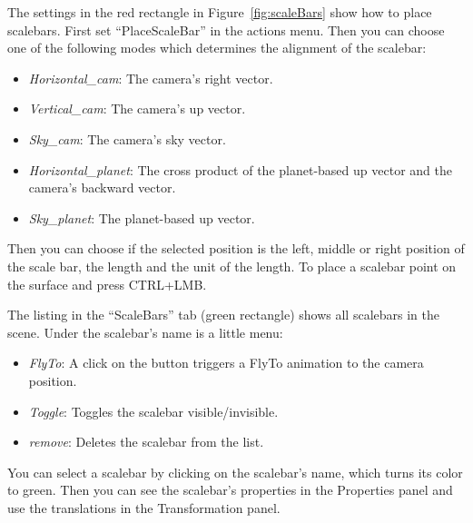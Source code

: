 The settings in the red rectangle in Figure~\ref{fig:scaleBars} show how to place scalebars. First set ``PlaceScaleBar'' in the actions menu. Then you can choose one of the following modes which determines the alignment of the scalebar:
\begin{itemize}
	\item \textit{Horizontal\_cam}: The camera's right vector.
	\item \textit{Vertical\_cam}: The camera's up vector.
	\item \textit{Sky\_cam}: The camera's sky vector.
	\item \textit{Horizontal\_planet}: The cross product of the planet-based up vector and the camera's backward vector.
	\item \textit{Sky\_planet}: The planet-based up vector.
	\label{tab:scaleBarsOrientations}
\end{itemize}

Then you can choose if the selected position is the left, middle or right position of the scale bar, the length and the unit of the length. To place a scalebar point on the surface and press CTRL+LMB.
	
The listing in the ``ScaleBars'' tab (green rectangle) shows all scalebars in the scene.
Under the scalebar's name is a little menu:
\begin{itemize}
	\item \textit{FlyTo}: A click on the button triggers a FlyTo animation to the camera position.
  \item \textit{Toggle}: Toggles the scalebar visible/invisible.
  \item \textit{remove}: Deletes the scalebar from the list.
\end{itemize} 
You can select a scalebar by clicking on the scalebar's name, which turns its color to green. Then you can see the scalebar's properties in the Properties panel and use the translations in the Transformation panel. \\

